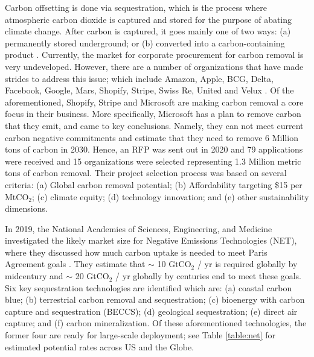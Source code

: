 \documentclass{article}
\begin{document}
Carbon offsetting is done via sequestration, which is the process where atmospheric carbon dioxide is captured and stored for the purpose of abating climate change. After carbon is captured, it goes mainly one of two ways: (a) permanently stored underground; or (b) converted into a carbon-containing product \cite{CBC19}. Currently, the market for corporate procurement for carbon removal is very undeveloped. However, there are a number of organizations that have made strides to address this issue; which include Amazon, Apple, BCG, Delta, Facebook, Google, Mars, Shopify, Stripe, Swiss Re, United and Velux \cite{Mic21}. Of the aforementioned, Shopify, Stripe and Microsoft are making carbon removal a core focus in their business. More specifically, Microsoft has a plan to remove carbon that they emit, and came to key conclusions. Namely, they can not meet current carbon negative commitments and estimate that they need to remove 6 Million tons of carbon in 2030. Hence, an RFP was sent out in 2020 and 79 applications were received and 15 organizations were selected representing 1.3 Million metric tons of carbon removal. Their project selection process was based on several criteria: (a) Global carbon removal potential; (b) Affordability targeting \$15 per MtCO$_{2}$; (c) climate equity; (d) technology innovation; and (e) other sustainability dimensions. 

In 2019, the National Academies of Sciences, Engineering, and Medicine investigated the likely market size for Negative Emissions Technologies (NET), where they discussed how much carbon uptake is needed to meet Paris Agreement goals \cite{NET19}. They estimate that $\sim$ 10 GtCO$_{2}$ / yr is required globally by midcentury and $\sim$ 20 GtCO$_{2}$ / yr globally by centuries end to meet these goals. Six key sequestration technologies are identified which are: (a) coastal carbon blue; (b) terrestrial carbon removal and sequestration; (c) bioenergy with carbon capture and sequestration (BECCS); (d) geological sequestration; (e) direct air capture;  and (f) carbon mineralization. Of these aforementioned technologies, the former four are ready for large-scale deployment; see Table \ref{table:net} for estimated potential rates across US and the Globe.
\end{document}
